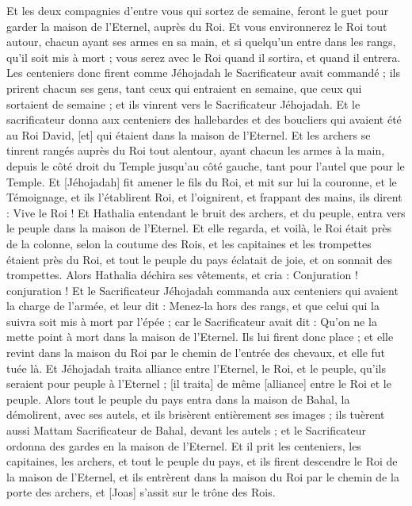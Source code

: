\begin{multicols}{2}
Et les deux compagnies d'entre vous qui sortez de semaine, feront le guet pour garder la maison de l'Eternel, auprès du Roi.
Et vous environnerez le Roi tout autour, chacun ayant ses armes en sa main, et si quelqu'un entre dans les rangs, qu'il soit mis à mort ; vous serez avec le Roi quand il sortira, et quand il entrera.
Les centeniers donc firent comme Jéhojadah le Sacrificateur avait commandé ; ils prirent chacun ses gens, tant ceux qui entraient en semaine, que ceux qui sortaient de semaine ; et ils vinrent vers le Sacrificateur Jéhojadah.
Et le sacrificateur donna aux centeniers des hallebardes et des boucliers qui avaient été au Roi David, [et] qui étaient dans la maison de l'Eternel.
Et les archers se tinrent rangés auprès du Roi tout alentour, ayant chacun les armes à la main, depuis le côté droit du Temple jusqu'au côté gauche, tant pour l'autel que pour le Temple.
Et [Jéhojadah] fit amener le fils du Roi, et mit sur lui la couronne, et le Témoignage, et ils l'établirent Roi, et l'oignirent, et frappant des mains, ils dirent : Vive le Roi !
Et Hathalia entendant le bruit des archers, et du peuple, entra vers le peuple dans la maison de l'Eternel.
Et elle regarda, et voilà, le Roi était près de la colonne, selon la coutume des Rois, et les capitaines et les trompettes étaient près du Roi, et tout le peuple du pays éclatait de joie, et on sonnait des trompettes. Alors Hathalia déchira ses vêtements, et cria : Conjuration ! conjuration !
Et le Sacrificateur Jéhojadah commanda aux centeniers qui avaient la charge de l'armée, et leur dit : Menez-la hors des rangs, et que celui qui la suivra soit mis à mort par l'épée ; car le Sacrificateur avait dit : Qu'on ne la mette point à mort dans la maison de l'Eternel.
Ils lui firent donc place ; et elle revint dans la maison du Roi par le chemin de l'entrée des chevaux, et elle fut tuée là.
Et Jéhojadah traita alliance entre l'Eternel, le Roi, et le peuple, qu'ils seraient pour peuple à l'Eternel ; [il traita] de même [alliance] entre le Roi et le peuple.
Alors tout le peuple du pays entra dans la maison de Bahal, la démolirent, avec ses autels, et ils brisèrent entièrement ses images ; ils tuèrent aussi Mattam Sacrificateur de Bahal, devant les autels ; et le Sacrificateur ordonna des gardes en la maison de l'Eternel.
Et il prit les centeniers, les capitaines, les archers, et tout le peuple du pays, et ils firent descendre le Roi de la maison de l'Eternel, et ils entrèrent dans la maison du Roi par le chemin de la porte des archers, et [Joas] s'assit sur le trône des Rois.

\end{multicols}
